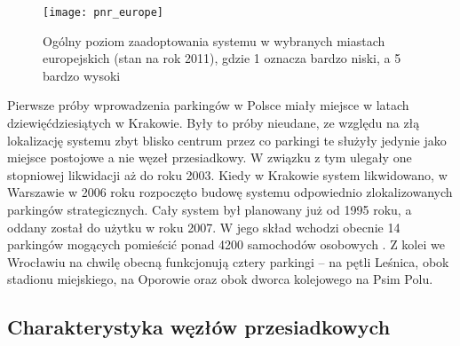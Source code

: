 \documentclass[twoside,12pt]{article}
\begin{document}
	\begin{figure}[H]
		\centering
		\texttt{[image: pnr\_europe]}\\
		\caption{Ogólny poziom zaadoptowania systemu \pnr{} w wybranych miastach europejskich (stan na rok 2011), gdzie 1 oznacza bardzo niski, a 5 bardzo wysoki}
		\label{pnr_europe}
	\end{figure}
	
	Pierwsze próby wprowadzenia parkingów \pnr{} w Polsce miały miejsce w latach dziewięćdziesiątych w Krakowie. Były to próby nieudane, ze względu na złą lokalizację systemu zbyt blisko centrum przez co parkingi te służyły jedynie jako miejsce postojowe a nie węzeł przesiadkowy. W związku z tym ulegały one stopniowej likwidacji aż do roku 2003. Kiedy w Krakowie system likwidowano, w Warszawie w 2006 roku rozpoczęto budowę systemu odpowiednio zlokalizowanych parkingów strategicznych. Cały system był planowany już od 1995 roku, a oddany został do użytku w roku 2007. W jego skład wchodzi obecnie 14 parkingów mogących pomieścić ponad 4200 samochodów osobowych \cite{rybczynska}. Z kolei we Wrocławiu na chwilę obecną funkcjonują cztery parkingi \pnr{} -- na pętli Leśnica, obok stadionu miejskiego, na Oporowie oraz obok dworca kolejowego na Psim Polu.
	
	\clearpage
	\subsection{Charakterystyka węzłów przesiadkowych}
	
\end{document}
